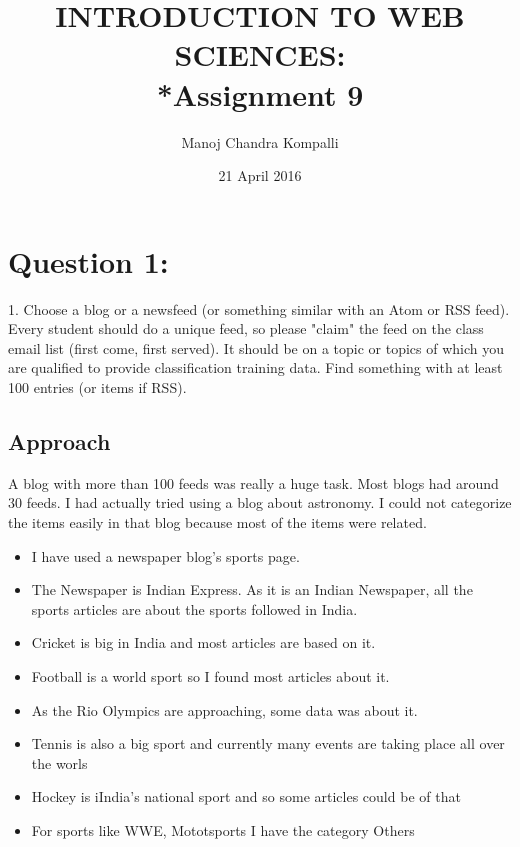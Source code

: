\documentclass[12pt]{article}
\begin{document}
\begin{titlepage}
\title{INTRODUCTION TO WEB SCIENCES:\\*Assignment 9}
\author{Manoj Chandra Kompalli}
\date{21 April 2016}
\maketitle
\end{titlepage}

\tableofcontents
\newpage

\section{Question 1:  }
1.  Choose a blog or a newsfeed (or something similar with an Atom
or RSS feed).  Every student should do a unique feed, so please
"claim" the feed on the class email list (first come, first served).
It should be on a topic or topics of which you are qualified to
provide classification training data.  Find something with at least
100 entries (or items if RSS).

\subsection{Approach}
A blog with more than 100 feeds was really a huge task. Most blogs had around 30 feeds. I had actually tried using a blog about astronomy. I could not categorize the items easily in that blog because most of the items were related.
\begin{itemize}
  \item I have used a newspaper blog’s  sports page.
  \item The Newspaper is Indian Express. As it is an Indian Newspaper, all the sports articles are about the sports followed in India.
  \item Cricket is big in India and most articles are based on it.
 \item Football is a world sport so I found most articles about it.
 \item  As the Rio Olympics are approaching, some data was about it. \item  Tennis is also a big sport and currently many events are taking place all over the worls
 \item Hockey is iIndia's national sport and so some articles could be of that
 \item For sports like WWE, Mototsports I have the category Others
\end{itemize}
\end{document}
